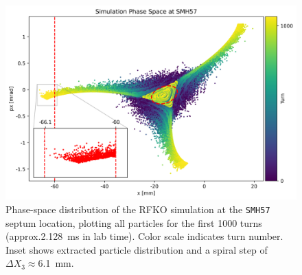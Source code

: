 \documentclass[11pt]{report}
\begin{document}
\begin{figure}[h]
  \centering
  \includegraphics[width=0.9\linewidth]{phase-space-sim.png}
  \cprotect\caption{Phase-space distribution of the RFKO simulation at the \verb|SMH57| septum location, plotting all particles for the first 1000 turns (approx.\qty{2.128}{\milli\second} in lab time). Color scale indicates turn number. Inset shows extracted particle distribution and a spiral step of $\Delta X_3\approx$\qty{6.1}{\milli\meter}.}
\end{figure}
\end{document}
